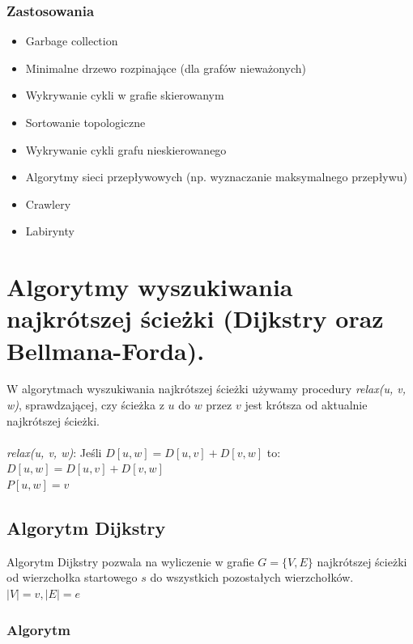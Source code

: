 \documentclass[12pt]{article}
\begin{document}
    \subsubsection{Zastosowania}

    \begin{itemize}
        \item Garbage collection
        \item Minimalne drzewo rozpinające (dla grafów nieważonych)
        \item Wykrywanie cykli w grafie skierowanym
        \item Sortowanie topologiczne
        \item Wykrywanie cykli grafu nieskierowanego
        \item Algorytmy sieci przepływowych (np. wyznaczanie maksymalnego przepływu)
        \item Crawlery
        \item Labirynty
    \end{itemize}

    \newpage

    \section{Algorytmy wyszukiwania najkrótszej ścieżki (Dijkstry oraz Bellmana-Forda).}

    W algorytmach wyszukiwania najkrótszej ścieżki używamy procedury \textit{relax(u, v, w)},
    sprawdzającej, czy ścieżka z $u$ do $w$ przez $v$ jest krótsza od aktualnie najkrótszej
    ścieżki.
    \\~\\
    \textit{relax(u, v, w)}:
    \vskip 0pt Jeśli $D[u, w] = D[u, v] + D[v, w]$ to:\\
    \hspace*{1cm} $D[u, w] = D[u, v] + D[v, w]$\\
    \hspace*{1cm} $P[u, w] = v$\\

    \subsection{Algorytm Dijkstry}

    Algorytm Dijkstry pozwala na wyliczenie w grafie $G = \{V, E\}$ najkrótszej ścieżki od wierzchołka
    startowego $s$ do wszystkich pozostałych wierzchołków. $|V| = v, |E| = e$

    \subsubsection{Algorytm}
\end{document}

